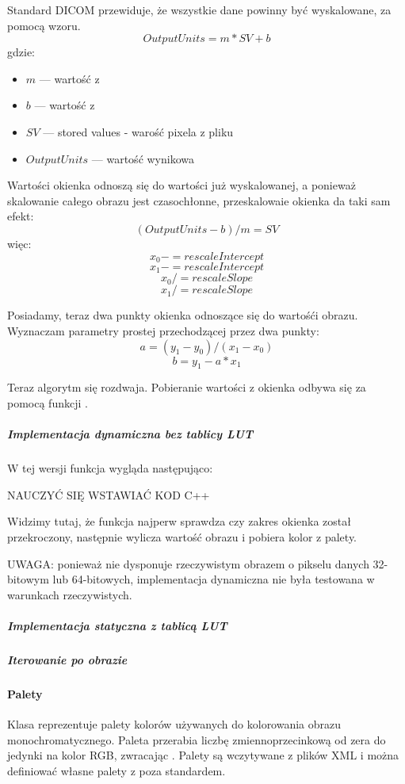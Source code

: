 Standard DICOM przewiduje, że wszystkie dane powinny być wyskalowane, za pomocą wzoru.
\[OutputUnits = m*SV + b\]
gdzie:
\begin{itemize}
    \item $m$ --- wartość z 
    \item $b$ --- wartość z 
    \item $SV$ --- stored values - warość pixela z pliku
    \item $OutputUnits$ --- wartość wynikowa
\end{itemize}

Wartości okienka odnoszą się do wartości już wyskalowanej, a ponieważ skalowanie całego obrazu jest czasochłonne, przeskalowaie okienka da taki sam efekt:
\[(OutputUnits - b ) / m = SV \]
więc:
\[x_0 -= rescaleIntercept\]
\[x_1 -= rescaleIntercept\]
\[x_0 /= rescaleSlope\]
\[x_1 /= rescaleSlope\]

Posiadamy, teraz dwa punkty okienka odnoszące się do wartośći obrazu.
Wyznaczam parametry prostej przechodzącej przez dwa punkty:
\[a = (y_1 - y_0) / (x_1 - x_0)\]
\[b = y_1 - a * x_1\]

\par
Teraz algorytm się rozdwaja.
Pobieranie wartości z okienka odbywa się za pomocą funkcji .


\subparagraph{Implementacja dynamiczna bez tablicy LUT}

\par
W tej wersji funkcja wygląda następująco:
\par
NAUCZYĆ SIĘ WSTAWIAĆ KOD C++
\par
Widzimy tutaj, że funkcja najperw sprawdza czy zakres okienka został przekroczony, następnie wylicza wartość obrazu i pobiera kolor z palety.
\par
UWAGA: ponieważ nie dysponuje rzeczywistym obrazem o pikselu danych 32-bitowym lub 64-bitowych, implementacja dynamiczna nie była testowana w warunkach rzeczywistych.

\subparagraph{Implementacja statyczna z tablicą LUT}

\subparagraph{Iterowanie po obrazie}

\paragraph{Palety}
Klasa  reprezentuje palety kolorów używanych do kolorowania obrazu monochromatycznego.
Paleta przerabia liczbę zmiennoprzecinkową od zera do jedynki na kolor RGB, zwracając .
Palety są wczytywane z plików XML i można definiować własne palety z poza standardem.

